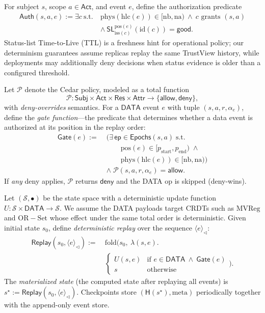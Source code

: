 \documentclass[10pt,journal,compsoc]{IEEEtran}
\begin{document}
\medskip
For subject $s$, scope $a\!\in\!\mathsf{Act}$, and event $e$, define the authorization predicate
\[
\begin{aligned}
\mathsf{Auth}(s,a,e) := \exists c\ \text{s.t.}\ & \mathrm{phys}(\mathrm{hlc}(e)) \in [\mathrm{nb},\mathrm{na})\ \land\ c \text{ grants }(s,a)\\
& \land\ \mathsf{SL}^{\mathrm{pos}(e)}_{\mathrm{iss}(c)}(\mathrm{id}(c))=\mathsf{good}.
\end{aligned}
\]
Status-list Time-to-Live (TTL) is a freshness hint for operational policy; our determinism guarantees assume replicas replay the same TrustView history, while deployments may additionally deny decisions when status evidence is older than a configured threshold.

\medskip

Let $\mathcal{P}$ denote the Cedar policy, modeled as a total function
\[
  \mathcal{P} : \mathsf{Subj}\times\mathsf{Act}\times\mathsf{Res}\times\mathsf{Attr}\to\{\mathsf{allow},\mathsf{deny}\},
\]
with \emph{deny-overrides} semantics.
For a $\mathsf{DATA}$ event $e$ with tuple $(s,a,r,\alpha_e)$, define the \emph{gate function}---the predicate that determines whether a data event is authorized at its position in the replay order:
\[
\begin{aligned}
\mathsf{Gate}(e) :=\;&
\Big(
    \exists\, \mathsf{ep} \in \mathsf{Epochs}(s,a)
    \;\text{s.t.}\; \\
&\qquad
    \mathrm{pos}(e) \in [p_{\mathrm{start}}, p_{\mathrm{end}})
    \;\wedge \\
&\qquad
    \mathrm{phys}(\mathrm{hlc}(e))
    \in [\mathrm{nb}, \mathrm{na})
\Big) \\
&\wedge\;
\mathcal{P}(s,a,r,\alpha_e) = \mathsf{allow}.
\end{aligned}
\]
If \emph{any} deny applies, $\mathcal{P}$ returns $\mathsf{deny}$ and the DATA op is skipped (deny-wins).

\medskip

Let $(\mathcal{S},\bullet)$ be the state space with a deterministic update function
$U:\mathcal{S}\times\mathsf{DATA}\to\mathcal{S}$.
We assume the DATA payloads target CRDTs such as $\mathrm{MVReg}$ and $\mathrm{OR\!-\!Set}$ whose effect under the same total order is deterministic.
Given initial state $s_0$, define \emph{deterministic replay} over the sequence $\langle e\rangle_{\triangleleft}$:
\[
\begin{aligned}
\mathsf{Replay}(s_0, \langle e\rangle_{\triangleleft}) :=\ &
\mathrm{fold}\Big(s_0,\ \lambda(s,e).\\
& \begin{cases}
  U(s,e) & \text{if } e\in\mathsf{DATA}\ \land\ \mathsf{Gate}(e)\\
  s      & \text{otherwise}
  \end{cases}\Big).
\end{aligned}
\]
The \emph{materialized state} (the computed state after replaying all events) is $s^\star := \mathsf{Replay}(s_0,\langle e\rangle_{\triangleleft})$.
Checkpoints store $(\mathsf{H}(s^\star),\mathrm{meta})$ periodically together with the append-only event store.
\end{document}

